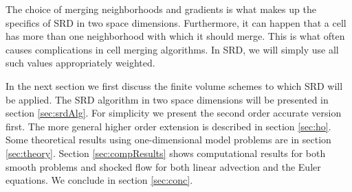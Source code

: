 The choice of merging neighborhoods and gradients is what makes up the
specifics of SRD in two space dimensions. Furthermore, it can happen
that a cell has more than one neighborhood with
which it should merge. This is what often causes complications in cell
merging algorithms. In SRD, we will simply use all such values appropriately
weighted.

In the next section  we first discuss the finite volume schemes to which SRD will
be applied.
The SRD algorithm in two space dimensions will be presented in section
\ref{sec:srdAlg}.
For simplicity we present the second order accurate version first.
The more general higher order extension is described in 
section \ref{sec:ho}.
Some theoretical results using one-dimensional model problems are in
section \ref{sec:theory}. 
Section \ref{sec:compResults} shows computational results for both smooth
problems and shocked flow for both linear advection and the Euler equations.  We conclude in section \ref{sec:conc}.
